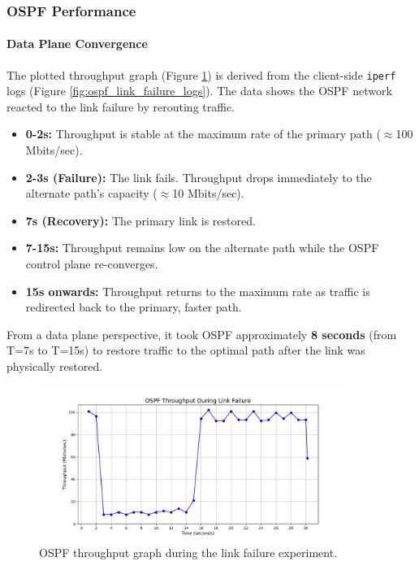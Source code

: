 \documentclass[12pt]{article}
\begin{document}
\subsubsection{OSPF Performance}
\paragraph{Data Plane Convergence}
The plotted throughput graph (Figure \ref{fig:ospf_throughput_graph}) is derived from the client-side \texttt{iperf} logs (Figure \ref{fig:ospf_link_failure_logs}). The data shows the OSPF network reacted to the link failure by rerouting traffic.
\begin{itemize}
    \item \textbf{0-2s:} Throughput is stable at the maximum rate of the primary path ($\approx$100 Mbits/sec).
    \item \textbf{2-3s (Failure):} The link fails. Throughput drops immediately to the alternate path's capacity ($\approx$10 Mbits/sec).
    \item \textbf{7s (Recovery):} The primary link is restored.
    \item \textbf{7-15s:} Throughput remains low on the alternate path while the OSPF control plane re-converges.
    \item \textbf{15s onwards:} Throughput returns to the maximum rate as traffic is redirected back to the primary, faster path.
\end{itemize}
From a data plane perspective, it took OSPF approximately \textbf{8 seconds} (from T=7s to T=15s) to restore traffic to the optimal path after the link was physically restored.

\begin{figure}[h!]
    \centering
    \includegraphics[width=0.9\textwidth]{p4_ospf_thpt_time.jpeg}
    \caption{OSPF throughput graph during the link failure experiment.}
    \label{fig:ospf_throughput_graph}
\end{figure}
\end{document}
